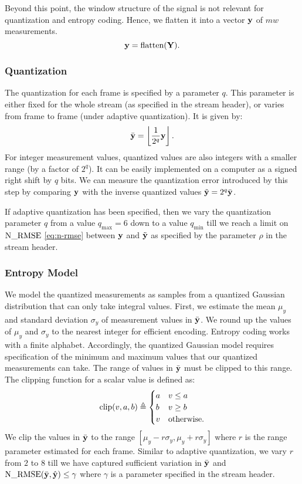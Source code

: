 Beyond this point, the window structure of the signal is not
relevant for quantization and entropy coding.
Hence, we flatten it into a vector $\mathbf{y}$ of $m w$ measurements.
\begin{equation}
\mathbf{y} = \text{flatten}(\mathbf{Y}).
\end{equation}
\subsubsection{Quantization}
The quantization for each frame is specified by a parameter $q$.
This parameter is either fixed for the whole stream
(as specified in the stream header),
or varies from frame to frame (under adaptive quantization).
It is given by:
\begin{equation}
\label{eq-enc-quantization}
\bar{\mathbf{y}} = \left \lfloor \frac{1}{2^q} \mathbf{y} \right \rfloor.
\end{equation}
For integer measurement values, quantized values are also
integers with a smaller range (by a factor of $2^q$).
It can be easily implemented on a computer as a signed
right shift by $q$ bits.
We can measure the quantization error introduced by
this step by comparing $\mathbf{y}$ with the inverse quantized values
$\tilde{\mathbf{y}} = 2^q \bar{\mathbf{y}}$.

If adaptive quantization has been specified, then we vary
the quantization parameter $q$ from a value $q_{\max}=6$
down to a value $q_{\min}$
till we reach a limit on $\mathrm{N\_RMSE}$ \eqref{eq:n-rmse} between $\mathbf{y}$ and $\tilde{\mathbf{y}}$
as specified by the parameter $\rho$ in the stream header.

\subsubsection{Entropy Model}
We model the quantized measurements as samples from
a quantized Gaussian distribution that can only take integral values.
First, we estimate the mean $\mu_y$ and standard deviation $\sigma_y$
of measurement values in $\bar{\mathbf{y}}$.
We round up the values of $\mu_y$ and $\sigma_y$ to the nearest integer
for efficient encoding.
Entropy coding works with a finite alphabet.
Accordingly, the quantized Gaussian model
requires specification of the minimum
and maximum values that our quantized
measurements can take.
The range of values in $\bar{\mathbf{y}}$ must be clipped to this range.
The clipping function for a scalar value is defined as:
\begin{equation}
\mathrm{clip} (v, a, b) \triangleq \begin{cases}
a & v \leq a \\
b & v \geq b \\
v & \text{otherwise}.
\end{cases}
\end{equation}
We clip the values in $\bar{\mathbf{y}}$ to the range
$[\mu_y - r \sigma_y, \mu_y + r \sigma_y]$
where $r$ is the range parameter estimated for each frame.
Similar to adaptive quantization, we vary $r$ from $2$ to $8$
till we have captured sufficient variation in $\bar{\mathbf{y}}$
and $\mathrm{N\_RMSE}(\bar{\mathbf{y}}, \hat{\mathbf{y}}) \leq \gamma$
where $\gamma$ is a parameter specified in the stream header.

